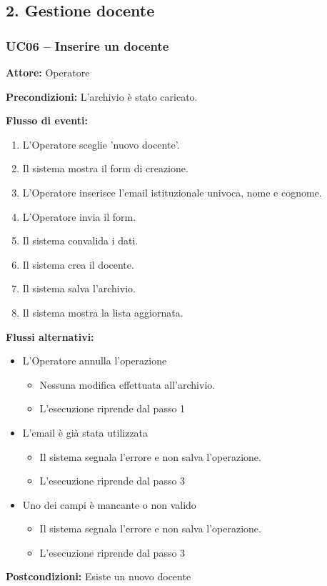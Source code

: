 \documentclass[a4paper,11pt]{article}
\begin{document}
\subsection*{2. Gestione docente}
\begin{samepage}
\subsubsection*{UC06 -- Inserire un docente}
\begin{ucbox}

\noindent\textbf{Attore:} Operatore\par
\noindent\textbf{Precondizioni:} L'archivio è stato caricato.\par

\noindent\textbf{Flusso di eventi:}
\begin{enumerate}
\item L'Operatore sceglie 'nuovo docente'. \item Il sistema mostra il form di creazione. \item L'Operatore inserisce l'email istituzionale univoca, nome e cognome. \item L'Operatore invia il form. \item Il sistema convalida i dati. \item Il sistema crea il docente. \item Il sistema salva l'archivio. \item Il sistema mostra la lista aggiornata. \end{enumerate}
\noindent\textbf{Flussi alternativi:}
\begin{itemize}
\item[4a.] L'Operatore annulla l'operazione
\begin{itemize}
\item Nessuna modifica effettuata all'archivio.
\item L'esecuzione riprende dal passo 1
\end{itemize}
\item[5a.] L'email è già stata utilizzata
\begin{itemize}
\item Il sistema segnala l'errore e non salva l'operazione.
\item L'esecuzione riprende dal passo 3
\end{itemize}
\item[5b.] Uno dei campi è mancante o non valido
\begin{itemize}
\item Il sistema segnala l'errore e non salva l'operazione.
\item L'esecuzione riprende dal passo 3
\end{itemize}
\end{itemize}
\noindent\textbf{Postcondizioni:} Esiste un nuovo docente\par
\end{ucbox}
\end{samepage}
\end{document}
